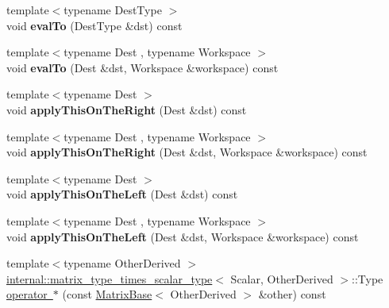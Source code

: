 \begin{DoxyCompactItemize}
{\footnotesize template$<$typename Dest\+Type $>$ }\\void {\bfseries eval\+To} (Dest\+Type \&dst) const
\item 
\mbox{\label{class_eigen_1_1_householder_sequence_a91d5354eb63c6d25e977fa4d393c78c4}} 
{\footnotesize template$<$typename Dest , typename Workspace $>$ }\\void {\bfseries eval\+To} (Dest \&dst, Workspace \&workspace) const
\item 
\mbox{\label{class_eigen_1_1_householder_sequence_a7ee4190e14c5e76a9680551c40db0a7d}} 
{\footnotesize template$<$typename Dest $>$ }\\void {\bfseries apply\+This\+On\+The\+Right} (Dest \&dst) const
\item 
\mbox{\label{class_eigen_1_1_householder_sequence_afc99539a130da4395c7df7d1ef1f43f3}} 
{\footnotesize template$<$typename Dest , typename Workspace $>$ }\\void {\bfseries apply\+This\+On\+The\+Right} (Dest \&dst, Workspace \&workspace) const
\item 
\mbox{\label{class_eigen_1_1_householder_sequence_a8bdafe8c85f1a4f76a983db1cfb87099}} 
{\footnotesize template$<$typename Dest $>$ }\\void {\bfseries apply\+This\+On\+The\+Left} (Dest \&dst) const
\item 
\mbox{\label{class_eigen_1_1_householder_sequence_a692c1997dc2acda1f4b282faf9432cd3}} 
{\footnotesize template$<$typename Dest , typename Workspace $>$ }\\void {\bfseries apply\+This\+On\+The\+Left} (Dest \&dst, Workspace \&workspace) const
\item 
{\footnotesize template$<$typename Other\+Derived $>$ }\\\mbox{\hyperlink{struct_eigen_1_1internal_1_1matrix__type__times__scalar__type}{internal\+::matrix\+\_\+type\+\_\+times\+\_\+scalar\+\_\+type}}$<$ Scalar, Other\+Derived $>$\+::Type \mbox{\hyperlink{class_eigen_1_1_householder_sequence_a8d1636f2dfa948d640256c3331d21357}{operator $\ast$}} (const \mbox{\hyperlink{class_eigen_1_1_matrix_base}{Matrix\+Base}}$<$ Other\+Derived $>$ \&other) const

\end{DoxyCompactItemize}
